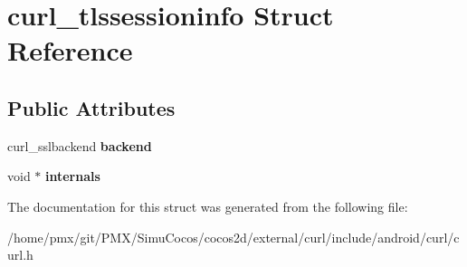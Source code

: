 \hypertarget{structcurl__tlssessioninfo}{}\section{curl\+\_\+tlssessioninfo Struct Reference}
\label{structcurl__tlssessioninfo}
\subsection*{Public Attributes}
\begin{DoxyCompactItemize}
\item 
\mbox{\label{structcurl__tlssessioninfo_a7ee41782ebe1a14c335dd2ff172bd3e1}} 
curl\+\_\+sslbackend {\bfseries backend}
\item 
\mbox{\label{structcurl__tlssessioninfo_a520d7ddca5805cd257cf140da7c5a5cb}} 
void $\ast$ {\bfseries internals}
\end{DoxyCompactItemize}


The documentation for this struct was generated from the following file\+:\begin{DoxyCompactItemize}
\item 
/home/pmx/git/\+P\+M\+X/\+Simu\+Cocos/cocos2d/external/curl/include/android/curl/curl.\+h\end{DoxyCompactItemize}
